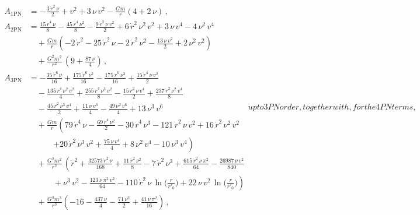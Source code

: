 \documentclass[prd,preprint,superscriptaddress,tightenlines,nofootinbib,
  eqsecnum,showpacs]{revtex4}
\begin{document}
\begin{subequations}\label{A}
\begin{align}
A_\text{1PN} &= -\frac{3\,\dot{r}^2\,\nu}{2} + v^2 +
3\,\nu\,v^2-\frac{G m}{r}\left(4 +2\,\nu \right) \,,\\
A_\text{2PN} &= \frac{15\,\dot{r}^4\,\nu}{8} -
\frac{45\,\dot{r}^4\,\nu^2}{8} - \frac{9\,\dot{r}^2\,\nu\,v^2}{2} +
6\,\dot{r}^2\,\nu^2\,v^2 + 3\,\nu\,v^4 -
4\,\nu^2\,v^4 \nonumber\\ &\quad + \frac{G m}{r}\left(
-2\,\dot{r}^2 - 25\,\dot{r}^2\,\nu - 2\,\dot{r}^2\,\nu^2 -
\frac{13\,\nu\,v^2}{2} + 2\,\nu^2\,v^2 \right) \nonumber\\
&\quad + \frac{G^2m^2}{r^2}\,\left( 9 + \frac{87\,\nu}{4}
\right)\,,\\
A_\text{3PN} &= -\frac{35\,\dot{r}^6\,\nu}{16} +
\frac{175\,\dot{r}^6\,\nu^2}{16} -
\frac{175\,\dot{r}^6\,\nu^3}{16}+\frac{15\,\dot{r}^4\,\nu\,v^2}{2}
\nonumber\\&\quad - \frac{135\,\dot{r}^4\,\nu^2\,v^2}{4} +
\frac{255\,\dot{r}^4\,\nu^3\,v^2}{8} -
\frac{15\,\dot{r}^2\,\nu\,v^4}{2} +
\frac{237\,\dot{r}^2\,\nu^2\,v^4}{8} \nonumber\\ &\quad
-\frac{45\,\dot{r}^2\,\nu^3\,v^4}{2} + \frac{11\,\nu\,v^6}{4} -
\frac{49\,\nu^2\,v^6}{4} + 13\,\nu^3\,v^6 \nonumber\\ &\quad +
\frac{G m}{r}\left( 79\,\dot{r}^4\,\nu -
\frac{69\,\dot{r}^4\,\nu^2}{2} - 30\,\dot{r}^4\,\nu^3 -
121\,\dot{r}^2\,\nu\,v^2 + 16\,\dot{r}^2\,\nu^2\,v^2
\right.\nonumber\\&\quad\quad\quad \left.+
20\,\dot{r}^2\,\nu^3\,v^2+\frac{75\,\nu\,v^4}{4} + 8\,\nu^2\,v^4 -
10\,\nu^3\,v^4 \right) \nonumber\\ &\quad +
\frac{G^2m^2}{r^2}\,\left( \dot{r}^2 +
\frac{32573\,\dot{r}^2\,\nu}{168} + \frac{11\,\dot{r}^2\,\nu^2}{8} -
7\,\dot{r}^2\,\nu^3 + \frac{615\,\dot{r}^2\,\nu\,\pi^2}{64} -
\frac{26987\,\nu\,v^2}{840} \right.\nonumber\\&\quad\quad\quad
+\left.  \nu^3\,v^2 - \frac{123\,\nu\,\pi^2\,v^2}{64} -
110\,\dot{r}^2\,\nu\,\ln \Big(\frac{r}{r'_0}\Big) + 22\,\nu\,v^2\,\ln
\Big(\frac{r}{r'_0}\Big) \right)\nonumber\\&\quad
+\frac{G^3m^3}{r^3}\left( -16 - \frac{437\,\nu}{4} -
\frac{71\,\nu^2}{2} + \frac{41\,\nu\,{\pi }^2}{16} \right)\,,
\end{align}
%
up to 3PN order, together with, for the 4PN terms,

\end{subequations}
\end{document}
